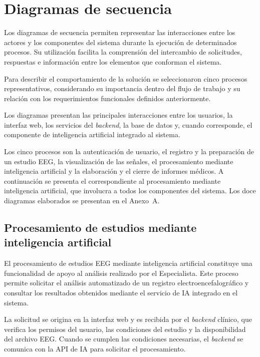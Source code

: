 \section{Diagramas de secuencia}
\label{sec:diagramas-secuencia}

Los diagramas de secuencia permiten representar las interacciones
entre los actores y los componentes del sistema durante la ejecución
de determinados procesos. Su utilización facilita la comprensión
del intercambio de solicitudes, respuestas e información entre
los elementos que conforman el sistema.

Para describir el comportamiento de la solución se seleccionaron cinco procesos representativos, considerando su importancia dentro del flujo de trabajo y su relación con los requerimientos funcionales definidos anteriormente.

Los diagramas presentan las principales interacciones entre
los usuarios, la interfaz web, los servicios del \textit{backend},
la base de datos y, cuando corresponde, el componente de
inteligencia artificial integrado al sistema.

\begin{nuevotexto}
Los cinco procesos son la autenticación de usuario, el registro y la preparación de un estudio EEG, la visualización de las señales, el procesamiento mediante inteligencia artificial y la elaboración y el cierre de informes médicos.
A continuación se presenta el correspondiente al procesamiento mediante inteligencia artificial, que involucra a todos los componentes del sistema.
Los doce diagramas elaborados se presentan en el Anexo~A.
\end{nuevotexto}

\subsection{Procesamiento de estudios mediante inteligencia artificial}
\label{subsec:secuencia-procesamiento-ia}

El procesamiento de estudios EEG mediante inteligencia
artificial constituye una funcionalidad de apoyo al
análisis realizado por el Especialista. Este proceso
permite solicitar el análisis automatizado de un
registro electroencefalográfico y consultar los
resultados obtenidos mediante el servicio de IA
integrado en el sistema.

La solicitud se origina en la interfaz web y es
recibida por el \textit{backend} clínico, que verifica
los permisos del usuario, las condiciones del
estudio y la disponibilidad del archivo EEG.
Cuando se cumplen las condiciones necesarias,
el \textit{backend} se comunica con la API de IA para
solicitar el procesamiento.

